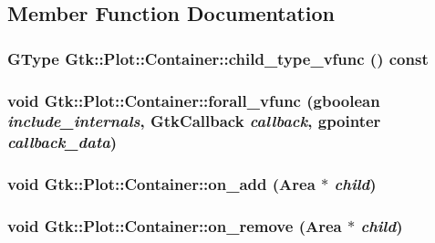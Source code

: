 \subsection{Member Function Documentation}
\hypertarget{classGtk_1_1Plot_1_1Container_ab10ca9ae4eadd60258504bc354c771a8}{
\subsubsection[{child\_\-type\_\-vfunc}]{\setlength{\rightskip}{0pt plus 5cm}GType Gtk::Plot::Container::child\_\-type\_\-vfunc () const}}
\label{classGtk_1_1Plot_1_1Container_ab10ca9ae4eadd60258504bc354c771a8}
\hypertarget{classGtk_1_1Plot_1_1Container_aa73effbe8c9a91cdd65dd81d1e0439e5}{
\subsubsection[{forall\_\-vfunc}]{\setlength{\rightskip}{0pt plus 5cm}void Gtk::Plot::Container::forall\_\-vfunc (gboolean {\em include\_\-internals}, \/  GtkCallback {\em callback}, \/  gpointer {\em callback\_\-data})}}
\label{classGtk_1_1Plot_1_1Container_aa73effbe8c9a91cdd65dd81d1e0439e5}
\hypertarget{classGtk_1_1Plot_1_1Container_a61d8e687c7aca24ab563ab978a8e225d}{
\subsubsection[{on\_\-add}]{\setlength{\rightskip}{0pt plus 5cm}void Gtk::Plot::Container::on\_\-add ({\bf Area} $\ast$ {\em child})}}
\label{classGtk_1_1Plot_1_1Container_a61d8e687c7aca24ab563ab978a8e225d}
\hypertarget{classGtk_1_1Plot_1_1Container_a5f89abb202ae55f0470dabe6b77c7da8}{
\subsubsection[{on\_\-remove}]{\setlength{\rightskip}{0pt plus 5cm}void Gtk::Plot::Container::on\_\-remove ({\bf Area} $\ast$ {\em child})}}
